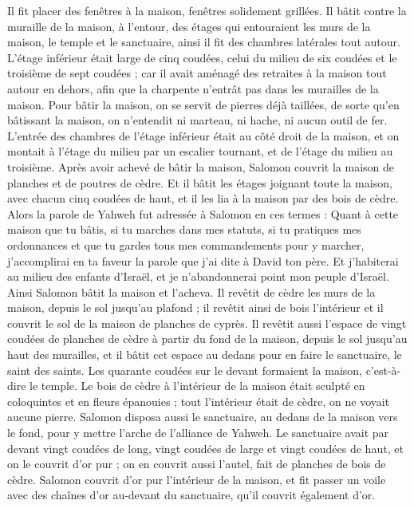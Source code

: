 \begin{multicols}{2}
Il fit placer des fenêtres à la maison, fenêtres solidement grillées.
Il bâtit contre la muraille de la maison, à l'entour, des étages qui entouraient les murs de la maison, le temple et le sanctuaire, ainsi il fit des chambres latérales tout autour.
L'étage inférieur était large de cinq coudées, celui du milieu de six coudées et le troisième de sept coudées ; car il avait aménagé des retraites à la maison tout autour en dehors, afin que la charpente n'entrât pas dans les murailles de la maison.
Pour bâtir la maison, on se servit de pierres déjà taillées, de sorte qu'en bâtissant la maison, on n'entendit ni marteau, ni hache, ni aucun outil de fer.
L'entrée des chambres de l'étage inférieur était au côté droit de la maison, et on montait à l'étage du milieu par un escalier tournant, et de l'étage du milieu au troisième.
Après avoir achevé de bâtir la maison, Salomon couvrit la maison de planches et de poutres de cèdre.
Et il bâtit les étages joignant toute la maison, avec chacun cinq coudées de haut, et il les lia à la maison par des bois de cèdre.
Alors la parole de Yahweh fut adressée à Salomon en ces termes :
Quant à cette maison que tu bâtis, si tu marches dans mes statuts, si tu pratiques mes ordonnances et que tu gardes tous mes commandements pour y marcher, j'accomplirai en ta faveur la parole que j'ai dite à David ton père.
Et j'habiterai au milieu des enfants d'Israël, et je n'abandonnerai point mon peuple d'Israël.
Ainsi Salomon bâtit la maison et l'acheva.
Il revêtit de cèdre les murs de la maison, depuis le sol jusqu'au plafond ; il revêtit ainsi de bois l'intérieur et il couvrit le sol de la maison de planches de cyprès.
Il revêtit aussi l'espace de vingt coudées de planches de cèdre à partir du fond de la maison, depuis le sol jusqu'au haut des murailles, et il bâtit cet espace au dedans pour en faire le sanctuaire, le saint des saints.
Les quarante coudées sur le devant formaient la maison, c'est-à-dire le temple.
Le bois de cèdre à l'intérieur de la maison était sculpté en coloquintes et en fleurs épanouies ; tout l'intérieur était de cèdre, on ne voyait aucune pierre.
Salomon disposa aussi le sanctuaire, au dedans de la maison vers le fond, pour y mettre l'arche de l'alliance de Yahweh.
Le sanctuaire avait par devant vingt coudées de long, vingt coudées de large et vingt coudées de haut, et on le couvrit d'or pur ; on en couvrit aussi l'autel, fait de planches de bois de cèdre.
Salomon couvrit d'or pur l'intérieur de la maison, et fit passer un voile avec des chaînes d'or au-devant du sanctuaire, qu'il couvrit également d'or.

\end{multicols}
